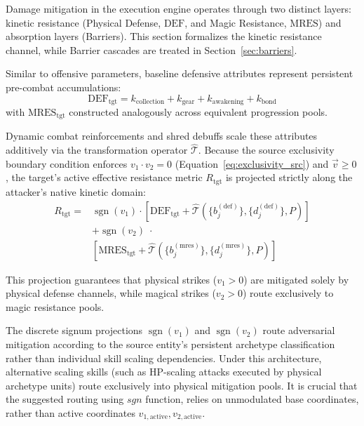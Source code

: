 \documentclass[twocolumn,10pt]{article}
\DeclareMathOperator{\sgn}{sgn}
\begin{document}
Damage mitigation in the execution engine operates through two distinct layers: kinetic resistance (Physical Defense, $\text{DEF}$, and Magic Resistance, $\text{MRES}$) and absorption layers (Barriers). This section formalizes the kinetic resistance channel, while Barrier cascades are treated in Section~\ref{sec:barriers}.

Similar to offensive parameters, baseline defensive attributes represent persistent pre-combat accumulations:
\begin{equation}
\text{DEF}_{\text{tgt}} = k_{\text{collection}} + k_{\text{gear}} + k_{\text{awakening}} + k_{\text{bond}}
\end{equation}
with $\text{MRES}_{\text{tgt}}$ constructed analogously across equivalent progression pools.

Dynamic combat reinforcements and shred debuffs scale these attributes additively via the transformation operator $\hat{\mathcal{T}}$. Because the source exclusivity boundary condition enforces $v_1 \cdot v_2 = 0$ (Equation~\ref{eq:exclusivity_src}) and $\vec{v} \ge 0$, the target's active effective resistance metric $R_{\text{tgt}}$ is projected strictly along the attacker's native kinetic domain:
\begin{equation}
\label{eq:r_tgt_modulated}
\begin{split}
  R_{\text{tgt}} = {} & \sgn(v_1) \cdot \left[ \text{DEF}_{\text{tgt}} + \hat{\mathcal{T}}\left(\{b^{(\text{def})}_j\}, \{d^{(\text{def})}_j\}, P\right) \right] \\
  & + \sgn(v_2) \; \cdot \\
  &\left[ \text{MRES}_{\text{tgt}} + \hat{\mathcal{T}}\left(\{b^{(\text{mres})}_j\}, \{d^{(\text{mres})}_j\}, P\right) \right]
\end{split}
\end{equation}

This projection guarantees that physical strikes ($v_1 > 0$) are mitigated solely by physical defense channels, while magical strikes ($v_2 > 0$) route exclusively to magic resistance pools.

The discrete signum projections $\sgn(v_1)$ and $\sgn(v_2)$ route adversarial mitigation according to the source entity's persistent archetype classification rather than individual skill scaling dependencies. Under this architecture, alternative scaling skills (such as HP-scaling attacks executed by physical archetype units) route exclusively into physical mitigation pools. It is crucial that the suggested routing using $\textit{sgn}$ function, relies on unmodulated base coordinates, rather than active coordinates $v_{1,\text{active}}, v_{2,\text{active}}$.
\end{document}
